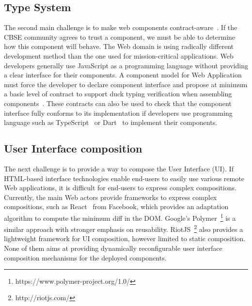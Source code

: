 
\subsection{Type System}
The second main challenge is to make web components contract-aware~\cite{beugnard1999making}. If the CBSE community agrees to trust a component, we must be able to determine how this component will behave. The Web domain is using radically different development method than the one used for mission-critical applications. Web developers generally use JavaScript as a programming language without providing a clear interface for their components. A component model for Web Application must force the developer to declare component interface and propose at minimum a basic level of contract to support duck typing verification when assembling components~\cite{beugnard1999making}. These contracts can also be used to check that the component interface fully conforms to its implementation if developers use programming language such as TypeScript~\cite{rastogi2015safe} or Dart~\cite{dhiman2012google} to implement their components.

\subsection{User Interface composition}
The next challenge is to provide a way to compose the User Interface (UI). If HTML-based interface technologies enable end-users to easily use various remote Web applications, it is difficult for end-users to express complex compositions. Currently, the main Web actors provide frameworks to express complex compositions, such as React~\cite{fedosejev2015react} from Facebook, which provides an adaptation algorithm to compute the minimum diff in the DOM. Google's Polymer~\footnote{https://www.polymer-project.org/1.0/} is a similar approach with stronger emphasis on reusability. RiotJS~\footnote{http://riotjs.com/} also provides a lightweight framework for UI composition, however limited to static composition.
None of them aims at providing dynamically reconfigurable user interface composition mechanisms for the deployed components.

